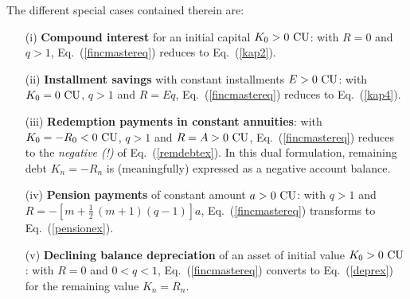 \medskip
\noindent
The different special cases contained therein are:
%
\begin{itemize}
\item[(i)] {\bf Compound interest} for an initial capital 
$K_{0}>0~{\rm CU}$: with $R=0$ and $q>1$, Eq.~(\ref{fincmastereq}) 
reduces to Eq.~(\ref{kap2}).

\item[(ii)] {\bf Installment savings} with constant installments 
$E>0~{\rm CU}$: with $K_{0}=0~{\rm CU}$, $q>1$ and $R=Eq$,
Eq.~(\ref{fincmastereq}) reduces to Eq.~(\ref{kap4}).

\item[(iii)] {\bf Redemption payments in constant annuities}:
with $K_{0}=-R_{0}<0~{\rm CU}$, $q>1$ and $R=A>0~{\rm CU}$, 
Eq.~(\ref{fincmastereq}) reduces to the \emph{negative (!)} of 
Eq.~(\ref{remdebtex}). In this dual formulation, remaining debt 
$K_{n}=-R_{n}$ is (meaningfully) expressed as a negative account 
balance.

\item[(iv)] {\bf Pension payments} of constant amount $a>0~{\rm 
CU}$: with $q>1$ and $\displaystyle R=-\left[m
+\frac{1}{2}\,(m+1)(q-1)\right]a$, Eq.~(\ref{fincmastereq}) 
transforms to Eq.~(\ref{pensionex}).

\item[(v)] {\bf Declining balance depreciation} of an asset of 
initial value $K_{0}>0~{\rm CU}$: with $R=0$ and $0<q<1$, 
Eq.~(\ref{fincmastereq}) converts to Eq.~(\ref{deprex}) for the 
remaining value $K_{n}=R_{n}$.

\end{itemize}
%


